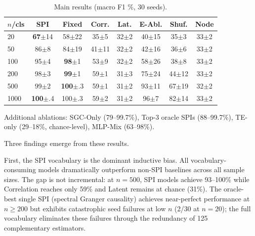 \documentclass{article}
\theoremstyle{plain}
\begin{document}
\begin{table}[t]
\caption{Main results (macro F1 \%, 30 seeds).}
\label{tab:main}
\vskip 0.1in
\begin{center}
\begin{small}
\begin{tabular}{lccccccc}
\toprule
$n$/cls & SPI & Fixed & Corr. & Lat. & E-Abl. & Shuf. & Node \\
\midrule
20   & \textbf{67}{\scriptsize$\pm$14} & 58{\scriptsize$\pm$22} & 35{\scriptsize$\pm$5}  & 32{\scriptsize$\pm$2} & 40{\scriptsize$\pm$15} & 35{\scriptsize$\pm$3} & 33{\scriptsize$\pm$2} \\
50   & 86{\scriptsize$\pm$8}  & 84{\scriptsize$\pm$19} & 41{\scriptsize$\pm$11} & 32{\scriptsize$\pm$2} & 42{\scriptsize$\pm$16} & 36{\scriptsize$\pm$6} & 33{\scriptsize$\pm$2} \\
100  & 95{\scriptsize$\pm$4}  & \textbf{98}{\scriptsize$\pm$1}  & 53{\scriptsize$\pm$9}  & 32{\scriptsize$\pm$2} & 58{\scriptsize$\pm$26} & 38{\scriptsize$\pm$8} & 33{\scriptsize$\pm$2} \\
200  & 98{\scriptsize$\pm$3}  & \textbf{99}{\scriptsize$\pm$1}  & 59{\scriptsize$\pm$1}  & 31{\scriptsize$\pm$3} & 75{\scriptsize$\pm$24} & 44{\scriptsize$\pm$12}& 33{\scriptsize$\pm$2} \\
500  & 99{\scriptsize$\pm$2}  & \textbf{100}{\scriptsize$\pm$.3}& 59{\scriptsize$\pm$1}  & 31{\scriptsize$\pm$2} & 93{\scriptsize$\pm$11} & 67{\scriptsize$\pm$19}& 32{\scriptsize$\pm$2} \\
1000 & \textbf{100}{\scriptsize$\pm$.4}& 100{\scriptsize$\pm$.3}& 59{\scriptsize$\pm$2}  & 31{\scriptsize$\pm$2} & 96{\scriptsize$\pm$7}  & 82{\scriptsize$\pm$14}& 33{\scriptsize$\pm$2} \\
\bottomrule
\end{tabular}
\end{small}
\end{center}
\vskip -0.15in
\end{table}

Additional ablations: SGC-Only (79--99.7\%), Top-3 oracle SPIs (88--99.7\%), TE-only (29--18\%, chance-level), MLP-Mix (63--98\%).

Three findings emerge from these results.

First, the SPI vocabulary is the dominant inductive bias. All vocabulary-consuming models dramatically outperform non-SPI baselines across all sample sizes. The gap is not incremental: at $n{=}500$, SPI models achieve 93--100\% while Correlation reaches only 59\% and Latent remains at chance (31\%). The oracle-best single SPI (spectral Granger causality) achieves near-perfect performance at $n \geq 200$ but exhibits catastrophic seed failures at low $n$ (2/30 at $n{=}20$); the full vocabulary eliminates these failures through the redundancy of 125 complementary estimators.
\end{document}

